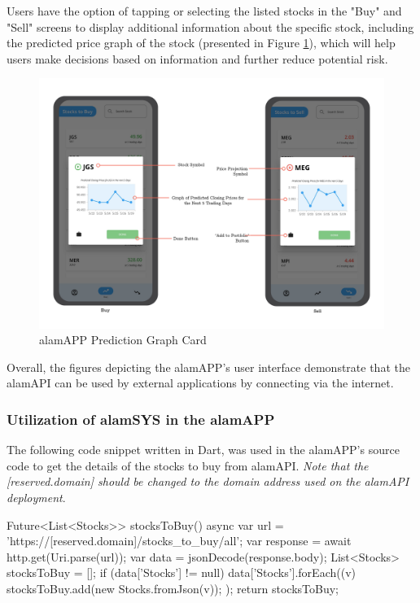 Users have the option of tapping or selecting the listed stocks in the "Buy" and "Sell" screens 
to display additional information about the specific stock, including the predicted price graph 
of the stock (presented in Figure \ref{fig:alamAPP_predCard}), which will help users make 
decisions based on information and further reduce potential risk.
\begin{figure}[ht]
  \centering
  \includegraphics[height=0.50\textheight]{./assets/Chapter_4/mobile_ui/prediction_ui.jpg}
  \caption{alamAPP Prediction Graph Card}
  \label{fig:alamAPP_predCard}
\end{figure}
\FloatBarrier

Overall, the figures depicting the alamAPP's user interface 
demonstrate that the alamAPI can be used by external applications 
by connecting via the internet.

\subsubsection{Utilization of alamSYS in the alamAPP}
\label{subsubsec:utilization_alamSYS-alamAPP}
The following code snippet written in Dart, was used in the alamAPP's source 
code to get the details of the stocks to buy from alamAPI.
\textit{Note that the [reserved.domain] should be changed to
the domain address used on the alamAPI deployment}.
\hfill \\
\begin{python}
    Future<List<Stocks>> stocksToBuy() async {
        var url = 'https://[reserved.domain]/stocks_to_buy/all';
        var response = await http.get(Uri.parse(url));
        var data = jsonDecode(response.body);
        List<Stocks> stocksToBuy = [];
        if (data['Stocks'] != null) {
        data['Stocks'].forEach((v) {
            stocksToBuy.add(new Stocks.fromJson(v));
          });
        }
        return stocksToBuy;
    }
\end{python}

